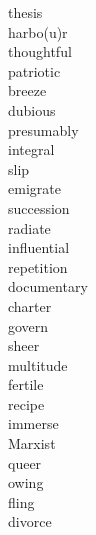 \documentclass[a4paper, 11pt]{ctexart}
\begin{document}
\begin{multicols*}{3}
\begin{description}
\item[thesis]

\item[harbo(u)r]

\item[thoughtful]

\item[patriotic]

\item[breeze]

\item[dubious]

\item[presumably]

\item[integral]

\item[slip]

\item[emigrate]

\item[succession]

\item[radiate]

\item[influential]

\item[repetition]

\item[documentary]

\item[charter]

\item[govern]

\item[sheer]

\item[multitude]

\item[fertile]

\item[recipe]

\item[immerse]

\item[Marxist]

\item[queer]

\item[owing]

\item[fling]

\item[divorce]


\end{description}
\end{multicols*}
\end{document}
